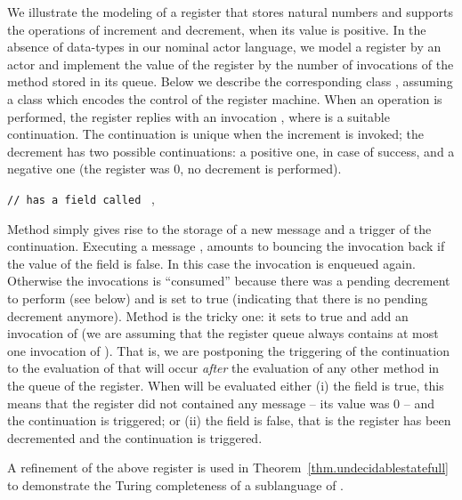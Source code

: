 \documentclass{LMCS}
\theoremstyle{plain}\newtheorem{proposition}[thm]{Proposition}
\theoremstyle{plain}\newtheorem{lemma}[thm]{Lemma}
\theoremstyle{plain}\newtheorem{theorem}[thm]{Theorem}
\theoremstyle{plain}\newtheorem{corollary}[thm]{Corollary}
\newcommand{\actor}{}
\begin{document}
\begin{exa}
We illustrate the modeling of a register that stores natural numbers and supports the
operations of increment and decrement, when its value is positive.
In the absence of data-types in our nominal actor language, we model a register by an actor
and implement the value of the register by the
number of invocations of the method  stored in its  queue.
Below we describe the corresponding class , assuming a class  which encodes the control of the register machine.
When an  operation
is performed, the register replies with an invocation , where  is a suitable continuation. 
The continuation is unique when the increment is invoked; the 
decrement has two possible continuations: a positive one, in case of success, and
a negative one (the register was 0, no decrement is performed).



\medskip

\; {\tt //  has a field called} \ , 

Method  simply gives rise to the storage of a new message   and 
a trigger of the continuation.
Executing a message , amounts to bouncing the invocation back if the 
value of the field  is false. In this case the invocation is enqueued again. 
Otherwise the invocations is ``consumed'' because there was a pending 
decrement to perform (see below) and  is set to true (indicating that there is no pending decrement
anymore). Method  is the tricky one: it sets  to true
and add an invocation of  (we are assuming that the register queue
always contains at most one invocation of ). That is, we are postponing the
triggering of the continuation to the evaluation of   that will
occur \emph{after} the evaluation of any other method in the queue of the register.
When  will be evaluated either (i) the  field is true,
this means that the register did not contained any  message -- its
value was 0 -- and the continuation  is triggered; or (ii) 
the  field is false, that is the register has been decremented and 
the  continuation  is triggered.

A refinement of the above register is used in Theorem~\ref{thm.undecidablestatefull} 
to demonstrate the Turing completeness of a sublanguage of {\actor}.
\end{exa}
\end{document}
